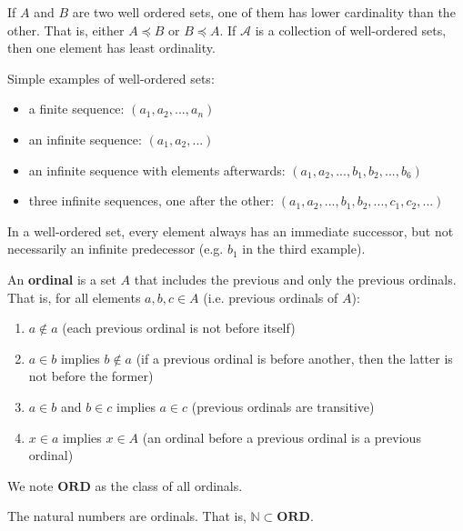 \documentclass{article}
\newcommand{\marginleft}[1] {\reversemarginpar\marginpar{#1}}
\def\ordinals{\textbf{ORD}}
\def\ordleq{\preceq}
\begin{document}
\begin{prop}[Ordinality]
	If $A$ and $B$ are two well ordered sets, one of them has lower cardinality than the other. That is, either $A \ordleq B$ or $B \ordleq A$. If $\mathcal{A}$ is a collection of well-ordered sets, then one element has least ordinality.
\end{prop}

\begin{remark}
	Simple examples of well-ordered sets:
	\begin{itemize}
		\item a finite sequence: $(a_1, a_2, ..., a_n)$
		\item an infinite sequence: $(a_1, a_2, ...)$
		\item an infinite sequence with elements afterwards: $(a_1, a_2, ..., b_1, b_2, ... , b_6)$
		\item three infinite sequences, one after the other: $(a_1, a_2, ..., b_1, b_2, ... , c_1, c_2, ...)$
	\end{itemize}
	In a well-ordered set, every element always has an immediate successor, but not necessarily an infinite predecessor (e.g. $b_1$ in the third example).
\end{remark}

\begin{defn}[Ordinals]
	An \textbf{ordinal} \marginleft{Ordinals: \ordinals} is a set $A$ that includes the previous and only the previous ordinals. That is, for all elements $a, b, c \in A$ (i.e. previous ordinals of $A$):
	\begin{enumerate}
		\item $a \notin a$ (each previous ordinal is not before itself)
		\item $a \in b$ implies $b \notin a$ (if a previous ordinal is before another, then the latter is not before the former)
		\item $a \in b$ and $b \in c$ implies $a \in c$ (previous ordinals are transitive)
		\item $x \in a$ implies $x \in A$ (an ordinal before a previous ordinal is a previous ordinal)
	\end{enumerate}
	We note $\ordinals$ as the class of all ordinals.
\end{defn}

\begin{prop}
	The natural numbers are ordinals. That is, $\mathbb{N} \subset \ordinals$.
\end{prop}
\end{document}
